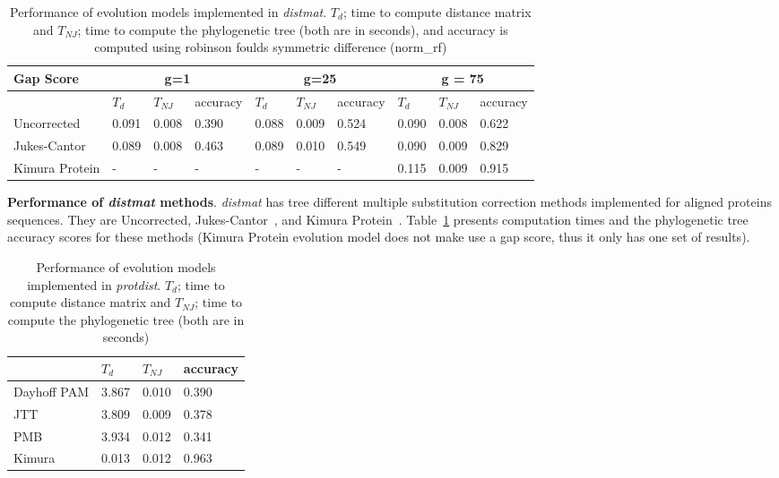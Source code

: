 \documentclass[11pt,letterpaper]{article}
\theoremstyle{definition}
\begin{document}
\begin{table}[!h]
\centering
	\begin{tabular}{l|lll|lll|lll}

Gap Score	& \multicolumn{3}{c}{g=1} & \multicolumn{3}{c}{g=25} &  \multicolumn{3}{c}{g = 75} \\
\hline
&	$T_d$	& $T_{NJ}$	& accuracy &	$T_d$	& $T_{NJ}$	& accuracy &	$T_d$	& $T_{NJ}$	& accuracy \\
\hline
Uncorrected		&	0.091	&	0.008	&	0.390	&	0.088	&	0.009	&	0.524	&	0.090	&	0.008	&	0.622	\\
Jukes-Cantor	&	0.089	&	0.008	&	0.463	&	0.089	&	0.010	&	0.549	&	0.090	&	0.009	&	0.829	\\
Kimura Protein	&	-	&	-	&	-	&	-	&	-	&	-	&	0.115	&	0.009	&	0.915	\\
\hline
\end{tabular}
\caption{Performance of evolution models implemented in \textit{distmat}. 
$T_d$; time to compute distance matrix and $T_{NJ}$; time to compute the phylogenetic tree (both are in seconds), and accuracy is computed using robinson foulds symmetric difference \cite{robinson1981comparison} (norm\_rf)}\label{tab:dist1}
\end{table}

\textbf{Performance of \textit{distmat} methods}. \textit{distmat} has tree different multiple substitution correction methods implemented for aligned proteins sequences. They are Uncorrected, Jukes-Cantor~\cite{jukes1969evolution}, and Kimura Protein~\cite{kimura1980simple}. Table~\ref{tab:dist1}  presents computation times and the phylogenetic tree accuracy scores for these methods (Kimura Protein evolution model does not make use a gap score, thus it only has one set of results).

\begin{table}[!h]
\centering
	\begin{tabular}{l|lll}
	\hline
	&	$T_d$	& $T_{NJ}$	& accuracy  \\
	\hline
	Dayhoff PAM	&	3.867	&	0.010	&	0.390	\\
	JTT			&	3.809	&	0.009	&	0.378	\\
	PMB			&	3.934	&	0.012	&	0.341	\\
	Kimura		&	0.013	&	0.012	&	0.963	\\
	\hline
	\end{tabular}
\caption{Performance of evolution models implemented in \textit{protdist}. 
$T_d$; time to compute distance matrix and $T_{NJ}$; time to compute the phylogenetic tree (both are in seconds)}\label{tab:dist2}
\end{table}
\end{document}
